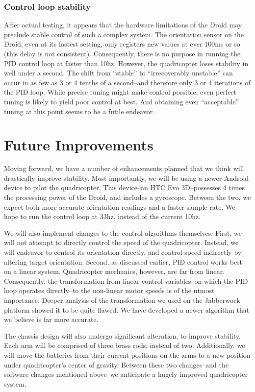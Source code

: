 \documentclass[letterpaper]{article}
\begin{document}
\subsubsection{Control loop stability}
\label{sec:cls}
After actual testing, it appears that the hardware limitations of the
Droid may preclude stable control of such a complex system.  The
orientation sensor on the Droid, even at its fastest setting, only
registers new values at ever 100ms or so (this delay is not
consistent).  Consequently, there is no purpose in running the PID
control loop at faster than 10hz.  However, the quadricopter loses
stability in well under a second.  The shift from ``stable'' to
``irrecoverably unstable'' can occur in as few as 3 or 4 tenths of a
second--and therefore only 3 or 4 iterations of the PID loop.  While
precise tuning might make control possible, even perfect tuning is
likely to yield poor control at best.  And obtaining even
``acceptable'' tuning at this point seems to be a futile endeavor.

\section{Future Improvements}

Moving forward, we have a number of enhancements planned that we think
will drastically improve stability.  Most importantly, we will be using
a newer Android device to pilot the quadricopter.  This device--an HTC
Evo 3D--possesses 4 times the processing power of the Droid, and
includes a gyroscope.  Between the two, we expect both more accurate
orientation readings and a faster sample rate.  We hope to run the
control loop at 33hz, instead of the current 10hz.

We will also implement changes to the control algorithms themselves.
First, we will not attempt to directly control the speed of the
quadricopter.  Instead, we will endeavor to control its orientation
directly, and control speed indirectly by altering target orientation.  
Second, as discussed earlier, PID control works best on a linear system.
Quadricopter mechanics, however, are far from linear.  Consequently, the
transformation from linear control variables--on which the PID loop
operates directly--to the non-linear motor speeds is of the utmost
importance.  Deeper analysis of the transformation we used on the
Jabberwock platform showed it to be quite flawed.  We have developed a
newer algorithm that we believe is far more accurate.

The chassis design will also undergo significant alteration, to improve
stability.  Each arm will be comprised of three brass rods, instead of
two.  Additionally, we will move the batteries from their current
positions on the arms to a new position under quadricopter's center of
gravity.  Between these two changes--and the software changes mentioned
above--we anticipate a hugely improved quadricopter system.
\end{document}
